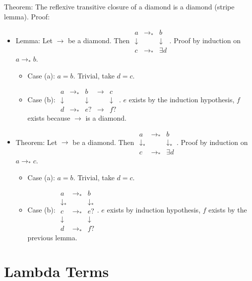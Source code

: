 \documentclass{article}
\begin{document}
Theorem: The reflexive transitive closure of a diamond is a diamond (stripe
lemma).
Proof:
\begin{itemize}
\item Lemma: Let $\to$ be a diamond. Then
$\begin{matrix}
a & \to_* & b \\
\downarrow & & \downarrow \\
c & \to_* & \exists d
  \end{matrix}$.
Proof by induction on $a \to_* b$.
\begin{itemize}
\item Case (a): $a = b$. Trivial, take $d=c$.
\item Case (b):
$\begin{matrix}
a & \to_* & b & \to & c\\
\downarrow & & \downarrow & & \downarrow\\
d & \to_* & e? & \to & f?
\end{matrix}$. $e$ exists by the induction hypothesis, $f$ exists because
$\to$ is a diamond.
\end{itemize}

\item Theorem:  Let $\to$ be a diamond. Then
$\begin{matrix}
a & \to_* & b \\
\downarrow_* & & \downarrow_* \\
c & \to_* & \exists d
  \end{matrix}$. Proof by induction on $a \to_* c$.
\begin{itemize}
\item Case (a): $a = b$. Trivial, take $d=c$.
\item Case (b):
$\begin{matrix}
a & \to_* & b\\
\downarrow_* & & \downarrow_* \\
c & \to_* & e?  \\
\downarrow & & \downarrow \\
d & \to_* & f?
\end{matrix}$. $e$ exists by induction hypothesis, $f$ exists by the previous lemma.
\end{itemize}
\end{itemize}



\section{Lambda Terms}
\end{document}
